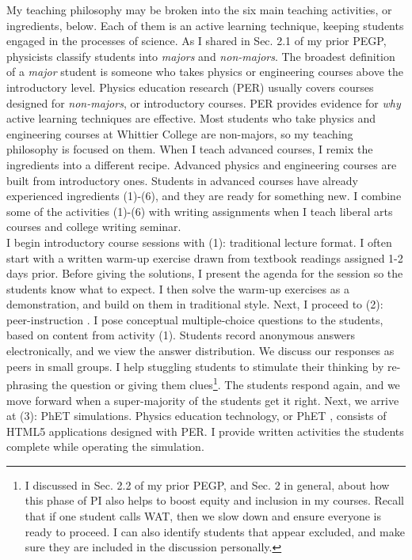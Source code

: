 \documentclass[../../../main.tex]{subfiles}
\begin{document}
My teaching philosophy may be broken into the six main teaching activities, or ingredients, below.  Each of them is an active learning technique, keeping students engaged in the processes of science.  As I shared in Sec. 2.1 of my prior PEGP, physicists classify students into \textit{majors} and \textit{non-majors}.  The broadest definition of a \textit{major} student is someone who takes physics or engineering courses above the introductory level.  Physics education research (PER) usually covers courses designed for \textit{non-majors}, or introductory courses.  PER provides evidence for \textit{why} active learning techniques are effective.  Most students who take physics and engineering courses at Whittier College are non-majors, so my teaching philosophy is focused on them.  When I teach advanced courses, I remix the ingredients into a different recipe.  Advanced physics and engineering courses are built from introductory ones.  Students in advanced courses have already experienced ingredients (1)-(6), and they are ready for something new.  I combine some of the activities (1)-(6) with writing assignments when I teach liberal arts courses and college writing seminar.
\\
\vspace{0.25cm}
I begin introductory course sessions with (1): traditional lecture format.  I often start with a written warm-up exercise drawn from textbook readings assigned 1-2 days prior.  Before giving the solutions, I present the agenda for the session so the students know what to expect.  I then solve the warm-up exercises as a demonstration, and build on them in traditional style.  Next, I proceed to (2): peer-instruction \cite{mazur2013peer}.  I pose conceptual multiple-choice questions to the students, based on content from activity (1).  Students record anonymous answers electronically, and we view the answer distribution.  We discuss our responses as peers in small groups.  I help stuggling students to stimulate their thinking by re-phrasing the question or giving them clues\footnote{I discussed in Sec. 2.2 of my prior PEGP, and Sec. 2 in general, about how this phase of PI also helps to boost equity and inclusion in my courses.  Recall that if one student calls WAT, then we slow down and ensure everyone is ready to proceed.  I can also identify students that appear excluded, and make sure they are included in the discussion personally.}.  The students respond again, and we move forward when a super-majority of the students get it right.  Next, we arrive at (3): PhET simulations.  Physics education technology, or PhET \cite{phet}, consists of HTML5 applications designed with PER.  I provide written activities the students complete while operating the simulation.
\end{document}
